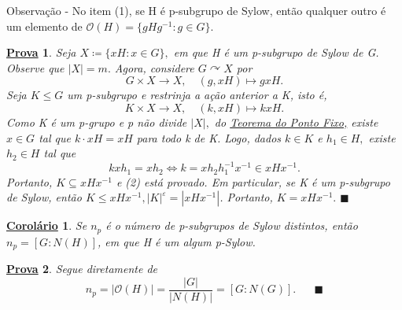 \documentclass{article}
\newtheorem*{crl*}{\underline{Corol\'ario}}
\newtheorem*{proof*}{\underline{Prova}}
\renewcommand\qedsymbol{$\blacksquare$}
\begin{document}
  Observa\c cão - No item (1), se H é p-subgrupo de Sylow, então qualquer outro é um elemento de
 \(\mathcal{O}(H) = \{gHg^{-1}: g\in G\}\).
\begin{proof*}
  Seja \(X\coloneqq \{xH: x\in G\},\) em que H é um p-subgrupo de Sylow de G. Observe que
  \(|X| = m.\) Agora, considere \(G \curvearrowright X\) por 
    \[
      G\times X\rightarrow X,\quad (g, xH)\mapsto gxH.
    \]
  Seja \(K\leq G\) um p-subgrupo e restrinja a a\c cão anterior a K, isto é, 
    \[
      K\times X\rightarrow X,\quad (k, xH)\mapsto kxH.
    \]
  Como K é um p-grupo e p não divide \(|X|,\) do \hyperlink{fixed_point}{Teorema do Ponto Fixo,} existe
  \(x\in G\) tal que \(k \cdot xH = xH\) para todo k de K. Logo, dados \(k\in K\) e 
  \(h_{1}\in H,\) existe \(h_{2}\in H\) tal que 
    \[
      kxh_{1} = xh_{2} \Longleftrightarrow k = xh_{2}h_{1}^{-1}x^{-1}\in xHx^{-1}.
    \]
    Portanto, \(K\subseteq{xHx^{-1}}\) e (2) está provado. Em particular, se K é um p-subgrupo de Sylow,
    então \(K\leq xHx^{-1}, |K|^{\varepsilon } = |xHx^{-1}|\). Portanto, \(K = xHx^{-1}.\) \qedsymbol
\end{proof*}
\begin{crl*}
  Se \(n_{p}\) é o número de p-subgrupos de Sylow distintos, então \(n_{p} = [G:N(H)]\), em
que H é um algum p-Sylow.
\end{crl*}
\begin{proof*}
  Segue diretamente de 
    \[
      n_{p} = |\mathcal{O}(H)| = \frac{|G|}{|N(H)|} = [G:N(G)].\quad\text{ \qedsymbol}
    \] 
\end{proof*}
\end{document}
